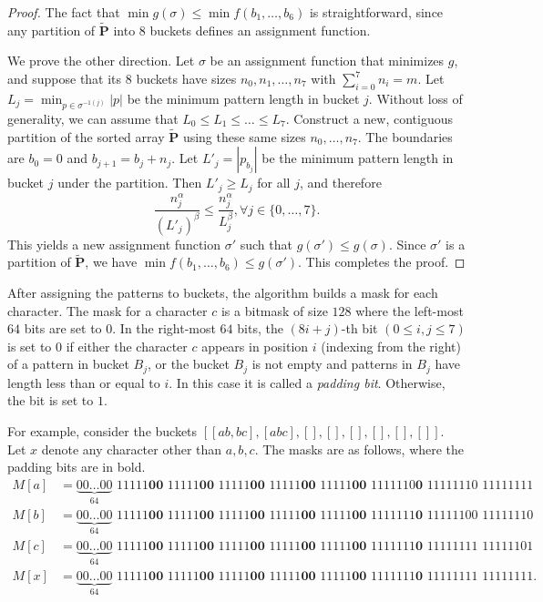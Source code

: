 \begin{proof}
  The fact that $\min g(\sigma) \le \min f(b_1,\ldots, b_6)$ is straightforward, since any partition of $\tilde{\bm{P}}$ into 8 buckets defines an assignment function.

  We prove the other direction. Let $\sigma$ be an assignment function that minimizes $g$, and suppose that its 8 buckets have sizes $n_0, n_1, \dots, n_7$ with $\sum_{i=0}^7 n_i = m$. Let $L_j = \min_{p \in \sigma^{-1(j)}} |p|$ be the minimum pattern length in bucket $j$. Without loss of generality, we can assume that $L_0 \le L_1 \le \dots \le L_7$. Construct a new, contiguous partition of the sorted array $\tilde{\bm{P}}$ using these same sizes $n_0, \dots, n_7$. The boundaries are $b_0 = 0$ and $b_{j+1} = b_j + n_j$. Let $L'_j = \left|p_{b_j}\right|$ be the minimum pattern length in bucket $j$ under the partition. Then $L'_j \ge L_j$ for all $j$, and therefore
  $$\frac{n_j^\alpha}{(L'_j)^\beta} \le \frac{n_j^\alpha}{L_j^\beta}, \forall j\in\{0,\ldots,7\}.$$
  This yields a new assignment function $\sigma'$ such that $g(\sigma') \le g(\sigma)$. Since $\sigma'$ is a partition of $\tilde{\bm{P}}$, we have $\min f(b_1,\ldots, b_6) \le g(\sigma')$. This completes the proof.
\end{proof}

After assigning the patterns to buckets, the algorithm builds a mask for each character. The mask for a character $c$ is a bitmask of size $128$ where the left-most $64$ bits are set to $0$. In the right-most $64$ bits, the $(8i+j)$-th bit $(0\le i,j\le 7)$ is set to $0$ if either the character $c$ appears in position $i$ (indexing from the right) of a pattern in bucket $B_j$, or the bucket $B_j$ is not empty and patterns in $B_j$ have length less than or equal to $i$. In this case it is called a \textit{padding bit}. Otherwise, the bit is set to $1$.

For example, consider the buckets $[[ab,bc],[abc],[],[],[],[],[],[]]$. Let $x$ denote any character other than $a,b,c$. The masks are as follows, where the padding bits are in bold.
\begin{align*}
  M[a] & = \underbrace{00\ldots00}_{64}\,\, 11111\textbf{00}\,\,11111\textbf{00}\,\,11111\textbf{00}\,\,11111\textbf{00}\,\,11111\textbf{00}\,\,1111110\textbf{0} \,\, 11111110\,\,11111111  \\
  M[b] & = \underbrace{00\ldots00}_{64}\,\, 11111\textbf{00}\,\,11111\textbf{00}\,\,11111\textbf{00}\,\,11111\textbf{00}\,\,11111\textbf{00}\,\,1111111\textbf{0} \,\, 11111100\,\,11111110  \\
  M[c] & = \underbrace{00\ldots00}_{64}\,\, 11111\textbf{00}\,\,11111\textbf{00}\,\,11111\textbf{00}\,\,11111\textbf{00}\,\,11111\textbf{00}\,\,1111111\textbf{0} \,\, 11111111\,\,11111101  \\
  M[x] & = \underbrace{00\ldots00}_{64}\,\, 11111\textbf{00}\,\,11111\textbf{00}\,\,11111\textbf{00}\,\,11111\textbf{00}\,\,11111\textbf{00}\,\,1111111\textbf{0} \,\, 11111111\,\,11111111.
\end{align*}

